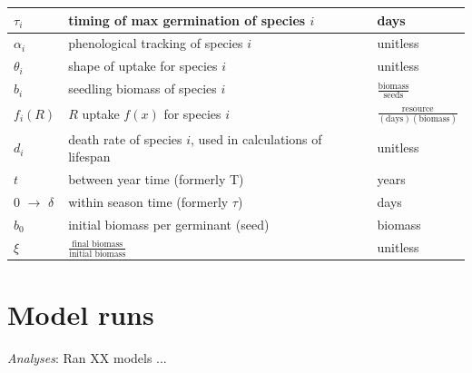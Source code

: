 \documentclass[11pt,letter]{article}
\begin{document}
\begin{center}
\begin{table}[h!]
\begin{tabular}{ | p{3.0cm} | p{6.0cm} | p{4.0cm} |}
\(\tau_{i}\) & timing of max germination of species \(i\) & days \\ \hline
\(\alpha_{i}\) & phenological tracking of species \(i\) & unitless \\ \hline
\(\theta_{i}\) & shape of uptake for species \(i\) & unitless\\ \hline
\hline
\(b_{i}\) & seedling biomass of species \(i\) & \(\frac{\text{biomass}}{\text{seeds}}\) \\ \hline
\(f_{i}(R)\) & \(R\) uptake \(f(x)\) for species \(i\) & \(\frac{\text{resource}}{(\text{days})(\text{biomass})}\)\\ \hline
\(d_{i}\) & death rate of species \(i\), used in calculations of lifespan & unitless \\ \hline
\(t\) & between year time (formerly T) & years \\ \hline
\(0\) $\rightarrow$ \(\delta\) & within season time (formerly \(\tau\)) & days \\ \hline
\(b_{0}\) & initial biomass per germinant (seed) & biomass \\ \hline
\(\xi\) & \(\frac{\text{final biomass}}{\text{initial biomass}}\) & unitless \\ \hline
\hline
\end{tabular}
\end{table}
\end{center}

\section{Model runs}


\emph{Analyses}: Ran XX models ...
\end{document}
